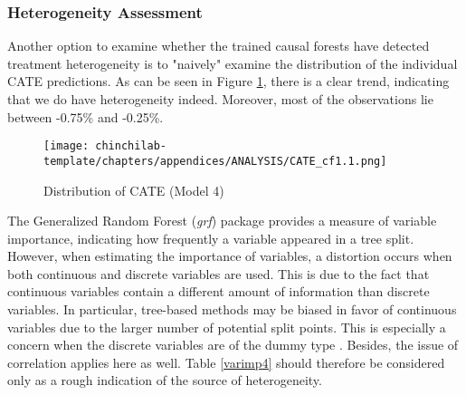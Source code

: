 \subsubsection*{Heterogeneity Assessment}
Another option to examine whether the trained causal forests have detected treatment heterogeneity is to "naively" examine the distribution of the individual CATE predictions. As can be seen in Figure \ref{cate4}, there is a clear trend, indicating that we do have heterogeneity indeed. Moreover, most of the observations lie between -0.75\% and -0.25\%.

\begin{figure}[H]
    \centering
    \texttt{[image: chinchilab-template/chapters/appendices/ANALYSIS/CATE\_cf1.1.png]}
    \caption{Distribution of CATE (Model 4)}
    \label{cate4}
\end{figure}



The Generalized Random Forest (\textit{grf}) package provides a measure of variable importance, indicating how frequently a variable appeared in a tree split. However, when estimating the importance of variables, a distortion occurs when both continuous and discrete variables are used. This is due to the fact that continuous variables contain a different amount of information than discrete variables. In particular, tree-based methods may be biased in favor of continuous variables due to the larger number of potential split points. This is especially a concern when the discrete variables are of the dummy type \citep[p. 3]{o2018causal}. Besides, the issue of correlation applies here as well. Table \ref{varimp4} should therefore be considered only as a rough indication of the source of heterogeneity.

